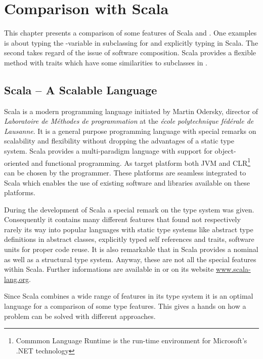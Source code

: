 \chapter{Comparison with Scala}
\label{sec:comparisonScala}
This chapter presents a comparison of some features of Scala and \ooplss.
One examples is about typing the \self-variable in subclassing for
\ooplss and explicitly typing in Scala. The second takes regard of the
issue of software composition. Scala provides a flexible method with
traits which have some similarities to subclasses in \ooplss.

\section{Scala -- A Scalable Language}
Scala is a modern programming language initiated by Martin Odersky,
director of \emph{Laboratoire de Méthodes de programmation} at the
\emph{école polytechnique fédérale de Lausanne}. It is a general
purpose programming language with special remarks on scalability
and flexibility without dropping the advantages of a static type
system. Scala provides a multi-paradigm language with support for
object-oriented and functional programming. As target platform both JVM
and CLR\footnote{Commmon Language Runtime is the run-time environment
for Microsoft's .NET technology} can be chosen by the programmer. These
platforms are seamless integrated to Scala which enables the use of
existing software and libraries available on these platforms.

During the development of Scala a special remark on the type system
was given. Consequently it contains many different features that found
not respectively rarely its way into popular languages with static
type systems like abstract type definitions in abstract classes,
explicitly typed self references and traits, software units for proper
code reuse. It is also remarkable that in Scala provides a nominal
as well as a structural type system. Anyway, these are not all the
special features within Scala. Further informations are available in
\cite{odersky_scala_2010,odersky_programming_2008} or on its website
\href{http://www.scala-lang.org/}{www.scala-lang.org}.

Since Scala combines a wide range of features in its type system it is
an optimal language for a comparison of some type features. This gives
a hands on how a problem can be solved with different approaches.

